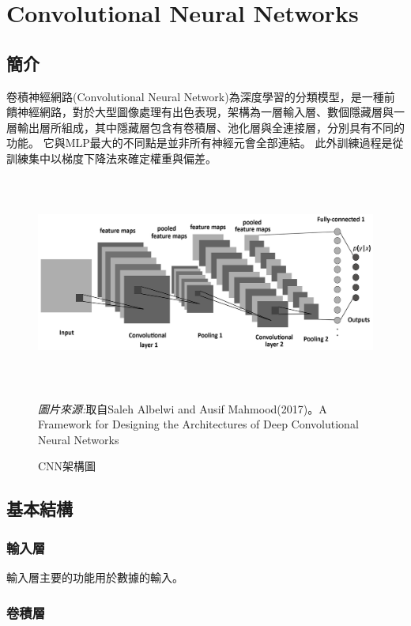 \chapter{Convolutional Neural Networks}
\label{chapter:intro}
\section{簡介}
卷積神經網路(Convolutional Neural Network)為深度學習的分類模型，是一種前饋神經網路，對於大型圖像處理有出色表現，架構為一層輸入層、數個隱藏層與一層輸出層所組成，其中隱藏層包含有卷積層、池化層與全連接層，分別具有不同的功能。
它與MLP最大的不同點是並非所有神經元會全部連結。
此外訓練過程是從訓練集中以梯度下降法來確定權重與偏差。
\begin{figure}[H]
	\centerline{\includegraphics[height=7cm]{pic/CNNAR.png}}
	\caption{CNN架構圖}
	\begin{minipage}{1\linewidth}
		\footnotesize
		\emph{圖片來源:}取自Saleh Albelwi and Ausif Mahmood(2017)。A Framework for Designing the Architectures of Deep Convolutional Neural Networks\end{minipage}

	\label{fig:CNNArchiteture}
\end{figure}


\section{基本結構}
\subsection{輸入層}
輸入層主要的功能用於數據的輸入。
\subsection{卷積層}
\label{subsec:ConvolutionLayer}


